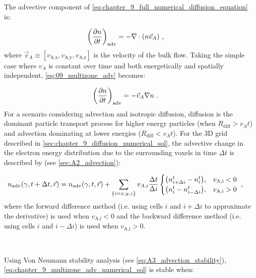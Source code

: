 The advective component of \autoref{eq:chapter_9_full_numerical_diffusion_equation} is:

\begin{equation}
    \begin{aligned}
    \qty(\pdv{n}{t})_\text{adv}&=-\nabla\cdot\qty(n\vec{v}_A)\text{ ,} 
    \end{aligned} \label{eq:09_multizone_adv}
\end{equation}
\noindent where $\vec{v}_A\equiv [v_\text{A,x},v_\text{A,y},v_\text{A,z}]$ is the velocity of the bulk flow. Taking the simple case where $v_A$ is constant over time and both energetically and spatially independent, \autoref{eq:09_multizone_adv} becomes:

\begin{equation}
    \begin{aligned}
    \qty(\pdv{n}{t})_\text{adv}&=-\vec{v}_A\nabla n\text{ .} 
    \end{aligned} \label{eq:chapter_9_advection_component}
\end{equation}
\noindent For a scenario considering advection and isotropic diffusion, diffusion is the dominant particle transport process for higher energy particles (when $R_\text{diff}>v_At$) and advection dominating at lower energies ($R_\text{diff}<v_At$). For the 3D grid described in \autoref{sec:chapter_9_diffusion_numerical_sol}, the advective change in the electron energy distribution due to the surrounding voxels in time $\Delta t$ is described by (see \autoref{sec:A2_advection}):

\begin{equation}
    \begin{aligned}
        n_\text{adv}\qty(\gamma,t+\Delta t,\vec{r})&=n_\text{adv}\qty(\gamma,t,\vec{r})+\sum_\qty{i=x,y,z}v_{A,i}\frac{\Delta t}{\Delta i}
        \begin{cases}
            \qty(n_{i+\Delta i}^t-n_{i}^t)\text{,}& v_\text{A,i}<0 \\
            \qty(n_{i}^t-n_{i-\Delta i}^t)\text{,}& v_\text{A,i}>0
        \end{cases} \text{ ,}
    \end{aligned} \label{eq:chapter_9_multizone_adv_numerical_sol}
\end{equation}
\noindent where the forward difference method (i.e. using cells $i$ and $i+\Delta i$ to approximate the derivative) is used when $v_\text{A,i}<0$ and the backward difference method (i.e. using cells $i$ and $i-\Delta i$) is used when $v_\text{A,i}>0$. 
\par~\par 
Using Von Neumann stability analysis (see \autoref{eq:A3_advection_stability}), \autoref{eq:chapter_9_multizone_adv_numerical_sol} is stable when:

